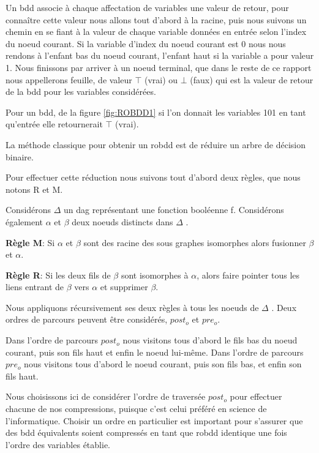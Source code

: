 \documentclass[french]{article}
\begin{document}
Un bdd associe à chaque affectation de variables une valeur de retour, pour connaître cette valeur nous allons tout d'abord à la racine, puis nous suivons un chemin en se fiant à la valeur de chaque variable données en entrée selon l'index du noeud courant. Si la variable d'index du noeud courant est 0 nous nous rendons à l'enfant bas du noeud courant, l'enfant haut si la variable a pour valeur 1. Nous finissons par arriver à un noeud terminal, que dans le reste de ce rapport nous appellerons feuille, de valeur \(\top\) (vrai) ou \(\bot\) (faux) qui est la valeur de retour de la bdd pour les variables considérées.

Pour un bdd, de la figure \ref{fig:ROBDD1} si l'on donnait les variables 101 en tant qu'entrée elle retournerait \(\top\) (vrai). 

La méthode classique pour obtenir un robdd est de réduire un arbre de décision binaire. 

Pour effectuer cette réduction nous suivons tout d'abord deux règles, que nous notons R et M.
\vspace{5mm} 

Considérons \(\Delta\) un dag représentant une fonction booléenne f. Considérons également \(\alpha\) et \(\beta\)  deux noeuds distincts dans \(\Delta\) .

\textbf{Règle M}: Si \(\alpha\) et \(\beta\) sont des racine des sous graphes isomorphes alors fusionner \(\beta\) et \(\alpha\).

\textbf{Règle R}: Si les deux fils de \(\beta\) sont isomorphes à \(\alpha\), alors faire pointer tous les liens entrant de \(\beta\) vers \(\alpha\) et supprimer \(\beta\).

Nous appliquons récursivement ses deux règles à tous les noeuds de \(\Delta\) .
\vspace{5mm} 
\newpage
Deux ordres de parcours peuvent être considérés, \(post_{o}\) et \(pre_{o}\).

Dans l'ordre de parcours \(post_{o}\) nous visitons tous d'abord le fils bas du noeud courant, puis son fils haut et enfin le noeud lui-même.
Dans l'ordre de parcours \(pre_{o}\) nous visitons tous d'abord le noeud courant, puis son fils bas, et enfin son fils haut.

Nous choisissons ici de considérer l'ordre de traversée \(post_{o}\) pour effectuer chacune de nos compressions, puisque c'est celui préféré en science de l'informatique. Choisir un ordre en particulier est important pour s'assurer que des bdd équivalents soient compressés en tant que robdd identique une fois l'ordre des variables établie.
\vspace{5mm} 
\end{document}
